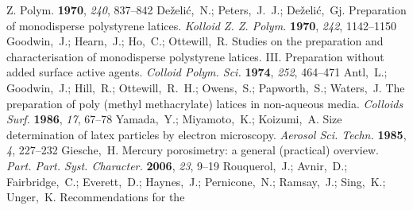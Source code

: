 \documentclass[journal=langd5,manuscript=article]{achemso}
\begin{document}
\begin{mcitethebibliography}{47}
{  Z. Polym.} \textbf{1970}, \emph{240}, 837--842\relax
\mciteBstWouldAddEndPuncttrue
\mciteSetBstMidEndSepPunct{\mcitedefaultmidpunct}
{\mcitedefaultendpunct}{\mcitedefaultseppunct}\relax
\EndOfBibitem
{}
De\v{z}eli\'{c},~N.; Peters,~J.~J.; De\v{z}eli\'{c},~{\relax Gj}. Preparation
  of monodisperse polystyrene latices. \emph{Kolloid Z. Z. Polym.}
  \textbf{1970}, \emph{242}, 1142--1150\relax
\mciteBstWouldAddEndPuncttrue
\mciteSetBstMidEndSepPunct{\mcitedefaultmidpunct}
{\mcitedefaultendpunct}{\mcitedefaultseppunct}\relax
\EndOfBibitem
{}
Goodwin,~J.; Hearn,~J.; Ho,~C.; Ottewill,~R. Studies on the preparation and
  characterisation of monodisperse polystyrene latices. {III.} Preparation
  without added surface active agents. \emph{Colloid Polym. Sci.}
  \textbf{1974}, \emph{252}, 464--471\relax
\mciteBstWouldAddEndPuncttrue
\mciteSetBstMidEndSepPunct{\mcitedefaultmidpunct}
{\mcitedefaultendpunct}{\mcitedefaultseppunct}\relax
\EndOfBibitem
{}
Antl,~L.; Goodwin,~J.; Hill,~R.; Ottewill,~R.~H.; Owens,~S.; Papworth,~S.;
  Waters,~J. The preparation of poly (methyl methacrylate) latices in
  non-aqueous media. \emph{Colloids Surf.} \textbf{1986}, \emph{17},
  67--78\relax
\mciteBstWouldAddEndPuncttrue
\mciteSetBstMidEndSepPunct{\mcitedefaultmidpunct}
{\mcitedefaultendpunct}{\mcitedefaultseppunct}\relax
\EndOfBibitem
{}
Yamada,~Y.; Miyamoto,~K.; Koizumi,~A. Size determination of latex particles by
  electron microscopy. \emph{Aerosol Sci. Techn.} \textbf{1985}, \emph{4},
  227--232\relax
\mciteBstWouldAddEndPuncttrue
\mciteSetBstMidEndSepPunct{\mcitedefaultmidpunct}
{\mcitedefaultendpunct}{\mcitedefaultseppunct}\relax
\EndOfBibitem
{}
Giesche,~H. Mercury porosimetry: a general (practical) overview. \emph{Part.
  Part. Syst. Character.} \textbf{2006}, \emph{23}, 9--19\relax
\mciteBstWouldAddEndPuncttrue
\mciteSetBstMidEndSepPunct{\mcitedefaultmidpunct}
{\mcitedefaultendpunct}{\mcitedefaultseppunct}\relax
\EndOfBibitem
{}
Rouquerol,~J.; Avnir,~D.; Fairbridge,~C.; Everett,~D.; Haynes,~J.;
  Pernicone,~N.; Ramsay,~J.; Sing,~K.; Unger,~K. Recommendations for the

\end{mcitethebibliography}
\end{document}
